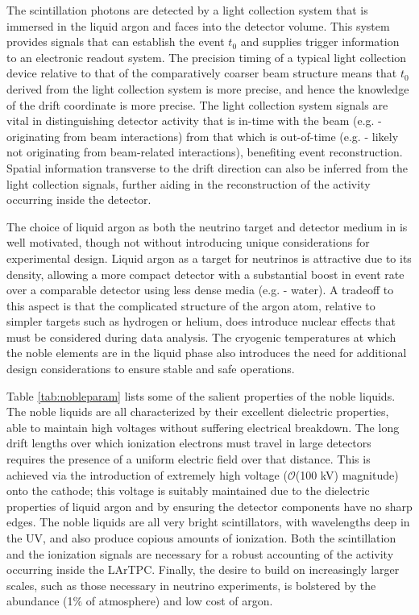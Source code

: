The scintillation photons are detected by a light collection system that is immersed in the liquid argon and faces into the detector volume.  This system provides signals that can establish the event $t_0$ and supplies trigger information to an electronic readout system.  The precision timing of a typical light collection device relative to that of the comparatively coarser beam structure means that $t_0$ derived from the light collection system is more precise, and hence the knowledge of the drift coordinate is more precise.  The light collection system signals are vital in distinguishing detector activity that is in-time with the beam (e.g. - originating from beam interactions) from that which is out-of-time (e.g. - likely not originating from beam-related interactions), benefiting event reconstruction.  Spatial information transverse to the drift direction can also be inferred from the light collection signals, further aiding in the reconstruction of the activity occurring inside the detector.


The choice of liquid argon as both the neutrino target and detector medium in \lartpcs is well motivated, though not without introducing unique considerations for experimental design.  Liquid argon as a target for neutrinos is attractive due to its density, allowing a more compact detector with a substantial boost in event rate over a comparable detector using less dense media (e.g. - water).  A tradeoff to this aspect is that the complicated structure of the argon atom, relative to simpler targets such as hydrogen or helium, does introduce nuclear effects that must be considered during data analysis.  The cryogenic temperatures at which the noble elements are in the liquid phase also introduces the need for additional design considerations to ensure stable and safe operations.

Table \ref{tab:nobleparam} lists some of the salient properties of the noble liquids.  The noble liquids are all characterized by their excellent dielectric properties, able to maintain high voltages without suffering electrical breakdown.  The long drift lengths over which ionization electrons must travel in large \lartpc detectors requires the presence of a uniform electric field over that distance.  This is achieved via the introduction of extremely high voltage ($\mathcal{O}$(100 kV) magnitude) onto the \lartpc cathode; this voltage is suitably maintained due to the dielectric properties of liquid argon and by ensuring the detector components have no sharp edges.  The noble liquids are all very bright scintillators, with wavelengths deep in the UV, and also produce copious amounts of ionization.  Both the scintillation and the ionization signals are necessary for a robust accounting of the activity occurring inside the LArTPC.  Finally, the desire to build \lartpcs on increasingly larger scales, such as those necessary in neutrino experiments, is bolstered by the abundance (1$\%$ of atmosphere) and low cost of argon.

